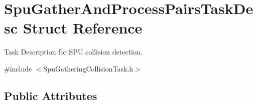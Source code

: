 \hypertarget{struct_spu_gather_and_process_pairs_task_desc}{\section{Spu\+Gather\+And\+Process\+Pairs\+Task\+Desc Struct Reference}
\label{struct_spu_gather_and_process_pairs_task_desc}
}


Task Description for S\+P\+U collision detection.  




{\ttfamily \#include $<$Spu\+Gathering\+Collision\+Task.\+h$>$}

\subsection*{Public Attributes}
